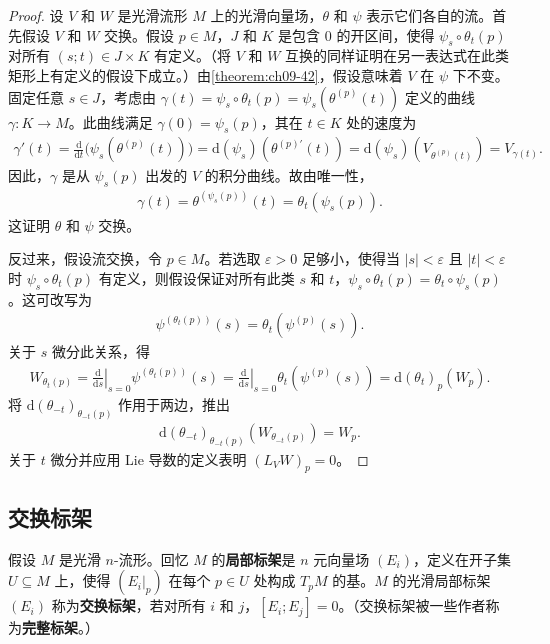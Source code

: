 \documentclass[../../main.tex]{subfiles}
\begin{document}
\begin{proof}
设 $V$ 和 $W$ 是光滑流形 $M$ 上的光滑向量场，$\theta$ 和 $\psi$ 表示它们各自的流。首先假设 $V$ 和 $W$ 交换。假设 $p\in M$，$J$ 和 $K$ 是包含 $0$ 的开区间，使得 $\psi_s\circ\theta_t(p)$ 对所有 $(s;t)\in J\times K$ 有定义。（将 $V$ 和 $W$ 互换的同样证明在另一表达式在此类矩形上有定义的假设下成立。）由\cref{theorem:ch09-42}，假设意味着 $V$ 在 $\psi$ 下不变。固定任意 $s\in J$，考虑由 $\gamma(t)=\psi_s\circ\theta_t(p)=\psi_s(\theta^{(p)}(t))$ 定义的曲线 $\gamma\colon K\to M$。此曲线满足 $\gamma(0)=\psi_s(p)$，其在 $t\in K$ 处的速度为
\begin{align*}
\gamma'(t)=\frac{\mathrm{d}}{\mathrm{d}t}\bigl(\psi_s(\theta^{(p)}(t))\bigr)=\mathrm{d}(\psi_s)(\theta^{(p)\prime}(t))=\mathrm{d}(\psi_s)(V_{\theta^{(p)}(t)})=V_{\gamma(t)}.
\end{align*}
因此，$\gamma$ 是从 $\psi_s(p)$ 出发的 $V$ 的积分曲线。故由唯一性，
\begin{align*}
\gamma(t)=\theta^{(\psi_s(p))}(t)=\theta_t(\psi_s(p)).
\end{align*}
这证明 $\theta$ 和 $\psi$ 交换。

反过来，假设流交换，令 $p\in M$。若选取 $\varepsilon>0$ 足够小，使得当 $|s|<\varepsilon$ 且 $|t|<\varepsilon$ 时 $\psi_s\circ\theta_t(p)$ 有定义，则假设保证对所有此类 $s$ 和 $t$，$\psi_s\circ\theta_t(p)=\theta_t\circ\psi_s(p)$。这可改写为
\begin{align*}
\psi^{(\theta_t(p))}(s)=\theta_t(\psi^{(p)}(s)).
\end{align*}
关于 $s$ 微分此关系，得
\begin{align*}
W_{\theta_t(p)}=\left.\frac{\mathrm{d}}{\mathrm{d}s}\right|_{s=0}\psi^{(\theta_t(p))}(s)=\left.\frac{\mathrm{d}}{\mathrm{d}s}\right|_{s=0}\theta_t(\psi^{(p)}(s))=\mathrm{d}(\theta_t)_p(W_p).
\end{align*}
将 $\mathrm{d}(\theta_{-t})_{\theta_{-t}(p)}$ 作用于两边，推出
\begin{align*}
\mathrm{d}(\theta_{-t})_{\theta_{-t}(p)}(W_{\theta_{-t}(p)})=W_p.
\end{align*}
关于 $t$ 微分并应用 Lie 导数的定义表明 $(L_VW)_p=0$。
\end{proof}

\subsection*{交换标架}

假设 $M$ 是光滑 $n$-流形。回忆 $M$ 的\textbf{局部标架}是 $n$ 元向量场 $(E_i)$，定义在开子集 $U\subseteq M$ 上，使得 $(E_i|_p)$ 在每个 $p\in U$ 处构成 $T_pM$ 的基。$M$ 的光滑局部标架 $(E_i)$ 称为\textbf{交换标架}，若对所有 $i$ 和 $j$，$[E_i;E_j]=0$。（交换标架被一些作者称为\textbf{完整标架}。）
\end{document}

